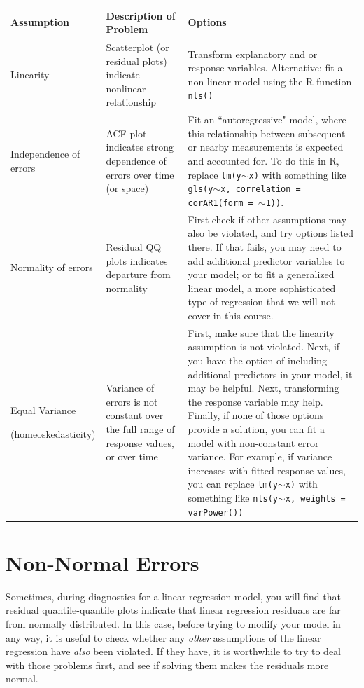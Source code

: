 \documentclass[twoside]{book}\usepackage[]{graphicx}\usepackage[]{xcolor}
\newcounter{example}[section]
\begin{document}
\begin{center}
  	\begin{tabular}{p{1.5in}|p{2in}|p{2.5in}}
			\hline
			Assumption & Description of Problem & Options \\
			 \hline
			Linearity & Scatterplot (or residual plots) indicate nonlinear relationship & Transform explanatory and or response variables. Alternative: fit a non-linear model using the R function \texttt{nls()} \\
			Independence of errors & ACF plot indicates strong dependence of errors over time (or space) & Fit an ``autoregressive" model, where this relationship between subsequent or nearby measurements is expected and accounted for.  To do this in R, replace \texttt{lm(y$\sim$x)} with something like \texttt{gls(y$\sim$x, correlation = corAR1(form = $\sim$1))}.  \\
			Normality of errors & Residual QQ plots indicates departure from normality & First check if other assumptions may also be violated, and try options listed there. If that fails, you may need to add additional predictor variables to your model; or to fit a generalized linear model, a more sophisticated type of regression that we will not cover in this course. \\
      Equal Variance 
      
      (homeoskedasticity) & Variance of errors is not constant over the full range of response values, or over time & First, make sure that the linearity assumption is not violated. Next, if you have the option of including additional predictors in your model, it may be helpful.  Next, transforming the response variable may help. Finally, if none of those options provide a solution, you can fit a model with non-constant error variance. For example, if variance increases with fitted response values, you can replace \texttt{lm(y$\sim$x)} with something like \texttt{nls(y$\sim$x, weights = varPower())}\\ 
			\hline
	\end{tabular}
	\end{center}
\section{Non-Normal Errors}
Sometimes, during diagnostics for a linear regression model, you will find that residual quantile-quantile plots indicate that linear regression residuals are far from normally distributed.  In this case, before trying to modify your model in any way, it is useful to check whether any \emph{other} assumptions of the linear regression have \emph{also} been violated.  If they have, it is worthwhile to try to deal with those problems first, and see if solving them makes the residuals more normal.
\end{document}
